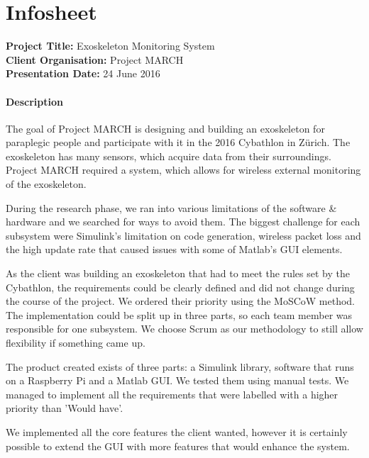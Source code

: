 \chapter{Infosheet}
\pagebreak
\begin{small}
{\bfseries Project Title:} Exoskeleton Monitoring System\\
{\bfseries Client Organisation:} Project MARCH\\
{\bfseries Presentation Date:} 24 June 2016

\subsubsection{Description}
The goal of Project MARCH is designing and building an exoskeleton for paraplegic people and participate with it in the 2016 Cybathlon in Zürich. The exoskeleton has many sensors, which acquire data from their surroundings. Project MARCH required a system, which allows for wireless external monitoring of the exoskeleton. 

During the research phase, we ran into various limitations of the software \& hardware and we searched for ways to avoid them. The biggest challenge for each subsystem were Simulink's limitation on code generation, wireless packet loss and the high update rate that caused issues with some of Matlab's GUI elements.  

As the client was building an exoskeleton that had to meet the rules set by the Cybathlon, the requirements could be clearly defined and did not change during the course of the project. We ordered their priority using the MoSCoW method. The implementation could be split up in three parts, so each team member was responsible for one subsystem. We choose Scrum as our methodology to still allow flexibility if something came up.

The product created exists of three parts: a Simulink library, software that runs on a Raspberry Pi and a Matlab GUI. We tested them using manual tests. We managed to implement all the requirements that were labelled with a higher priority than 'Would have'. 

We implemented all the core features the client wanted, however it is certainly possible to extend the GUI with more features that would enhance the system.


\end{small}
